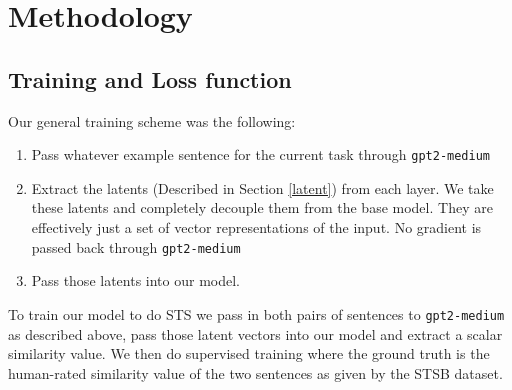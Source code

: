 \documentclass[14pt]{article}
\begin{document}

\section{Methodology}
\subsection{Training and Loss function} \label{Loss} \label{Training}
Our general training scheme was the following:
\begin{enumerate}
    \item Pass whatever example sentence for the current task through \verb|gpt2-medium|
    \item Extract the latents (Described in Section \ref{latent}) from each layer. We take these latents and completely decouple them from the base model. They are effectively just a set of vector representations of the input. No gradient is passed back through \verb|gpt2-medium|
    \item Pass those latents into our model.
\end{enumerate}
To train our model to do STS we pass in both pairs of sentences to \verb|gpt2-medium| as described above, pass those latent vectors into our model and extract a scalar similarity value. We then do supervised training where the ground truth is the human-rated similarity value of the two sentences as given by the STSB dataset.
\end{document}
